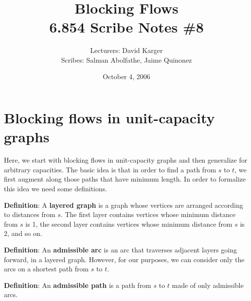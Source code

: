 \documentclass{article}
\title{Blocking Flows \\ 6.854 Scribe Notes \#8}
\date{October 4, 2006}
\author{Lecturers: David Karger\\ Scribes: Salman Abolfathe, Jaime Quinonez}
\begin{document}
%
%
%
%

%



\section{ Blocking flows in unit-capacity graphs}

Here, we start with blocking flows in unit-capacity graphs and
then generalize for arbitrary capacities. The basic idea is that in order to
find a path from $s$ to $t$, we first augment along those paths that
have minimum length. In order to formalize this idea we need some
definitions.

\textbf{Definition}:
A {\bf layered graph} is a graph whose vertices are arranged according to distances from $s$.  The first layer contains vertices whose minimum distance from $s$ is 1, the second layer contains vertices whose minimum distance from $s$ is 2, and so on.

\textbf{Definition}:
An {\bf admissible arc} is an arc that traverses adjacent layers going forward, in a layered graph.  However, for our purposes, we can consider only the arcs on a shortest path from $s$ to $t$.

\textbf{Definition}:
An {\bf admissible path} is a path from $s$ to $t$ made of only admissible
arcs.
\end{document}
